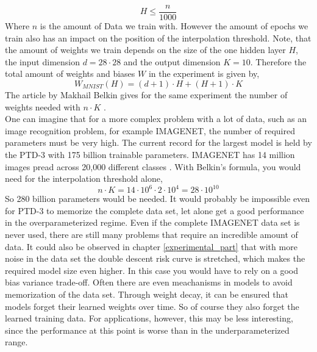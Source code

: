 $$
H \leq \frac{n}{1000} 
$$
Where  $n$ is the amount of Data we train with. However the amount of epochs we train also has an impact on the position of the interpolation threshold. Note, that the amount of weights we train depends on the size of the one hidden layer $H$, the input dimension $d = 28\cdot28$ and the output dimension $K = 10$. Therefore the total amount of weights and biases $W$ in the experiment is given by,
$$
W_{MNIST}(H) = (d+1)\cdot H + (H+1) \cdot K
$$
The article by Makhail Belkin gives for the same experiment the number of weights needed with $n\cdot K$ \cite{belkin}. \\
One can imagine that for a more complex problem with a lot of data, such as an image recognition problem, for example IMAGENET, the number of required parameters must be very high. The current record for the largest model is held by the PTD-3 with 175 billion trainable parameters\cite{Artificial_neural_network}. IMAGENET has 14 million images pread across 20,000 different classes \cite{wikipedia_Machine_learning}. With Belkin's formula, you would need for the interpolation threshold alone,
$$
n \cdot K = 14 \cdot 10^{6} \cdot 2 \cdot 10^{4} = 28 \cdot 10^{10}
$$
So 280 billion parameters would be needed. It would probably be impossible even for PTD-3 to memorize the complete data set, let alone get a good performance in the overparameterized regime. Even if the complete IMAGENET data set is never used, there are still many problems that require an incredible amount of data. It could also be observed in chapter \ref{experimental_part} that with more noise in the data set the double descent risk curve is stretched, which makes the required model size even higher. In this case you would have to rely on a good bias variance trade-off. Often there are even meachanisms in models to avoid memorization of the data set. Through weight decay, it can be ensured that models forget their learned weights over time. So of course they also forget the learned training data. For applications, however, this may be less interesting, since the performance at this point is worse than in the underparameterized range.
\\
